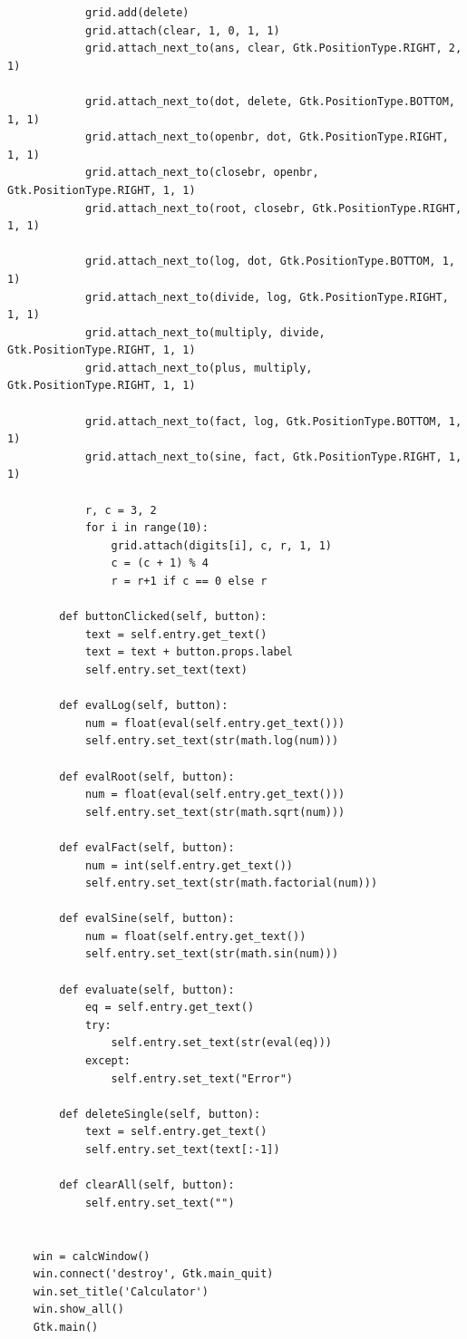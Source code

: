 \documentclass{article}
\begin{document}
\begin{verbatim}
            grid.add(delete)
            grid.attach(clear, 1, 0, 1, 1)
            grid.attach_next_to(ans, clear, Gtk.PositionType.RIGHT, 2, 1)
    
            grid.attach_next_to(dot, delete, Gtk.PositionType.BOTTOM, 1, 1)
            grid.attach_next_to(openbr, dot, Gtk.PositionType.RIGHT, 1, 1)
            grid.attach_next_to(closebr, openbr, Gtk.PositionType.RIGHT, 1, 1)
            grid.attach_next_to(root, closebr, Gtk.PositionType.RIGHT, 1, 1)
    
            grid.attach_next_to(log, dot, Gtk.PositionType.BOTTOM, 1, 1)
            grid.attach_next_to(divide, log, Gtk.PositionType.RIGHT, 1, 1)
            grid.attach_next_to(multiply, divide, Gtk.PositionType.RIGHT, 1, 1)
            grid.attach_next_to(plus, multiply, Gtk.PositionType.RIGHT, 1, 1)
    
            grid.attach_next_to(fact, log, Gtk.PositionType.BOTTOM, 1, 1)
            grid.attach_next_to(sine, fact, Gtk.PositionType.RIGHT, 1, 1)
    
            r, c = 3, 2
            for i in range(10):
                grid.attach(digits[i], c, r, 1, 1)
                c = (c + 1) % 4
                r = r+1 if c == 0 else r
    
        def buttonClicked(self, button):
            text = self.entry.get_text()
            text = text + button.props.label
            self.entry.set_text(text)
    
        def evalLog(self, button):
            num = float(eval(self.entry.get_text()))
            self.entry.set_text(str(math.log(num)))
    
        def evalRoot(self, button):
            num = float(eval(self.entry.get_text()))
            self.entry.set_text(str(math.sqrt(num)))
        
        def evalFact(self, button):
            num = int(self.entry.get_text())
            self.entry.set_text(str(math.factorial(num)))
    
        def evalSine(self, button):
            num = float(self.entry.get_text())
            self.entry.set_text(str(math.sin(num)))
    
        def evaluate(self, button):
            eq = self.entry.get_text()
            try:
                self.entry.set_text(str(eval(eq)))
            except:
                self.entry.set_text("Error")
    
        def deleteSingle(self, button):
            text = self.entry.get_text()
            self.entry.set_text(text[:-1])
    
        def clearAll(self, button):
            self.entry.set_text("")
    
    
    win = calcWindow()
    win.connect('destroy', Gtk.main_quit)
    win.set_title('Calculator')
    win.show_all()
    Gtk.main()
\end{verbatim}
\end{document}
